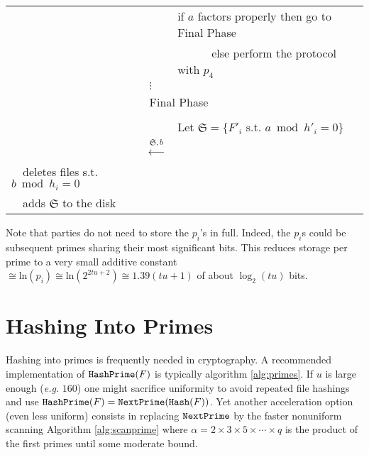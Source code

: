 \documentclass[11pt]{llncs}
\begin{document}
\begin{center}
\begin{tabular}{lcl}
                                   &                                                      &if $a$ factors properly then go to {\sf Final Phase}\\
                                   &                                                      &~~~~~~else perform the protocol with $p_4$ ~~\\
                                   &                  $\vdots$
& \\\midrule
\multicolumn{3}{c}{{\sf Final Phase~~}} \\\midrule
                                   &                                                      & \\
                                   &                                                      &Let $\mathfrak{S}=\{F'_i \mbox{~s.t.~} a \bmod h'_i =0\}$~~\\
                                   &~~{\LARGE $\stackrel{\mathfrak{S},b}{\longleftarrow}$}&\\
                                   ~~deletes files s.t. $b \bmod h_i =0$&                                                      &\\
                                   ~~adds $\mathfrak{S}$ to the disk
                                   &
                                   &\\\bottomrule
\end{tabular}
\end{center}

Note that parties do not need to store the $p_i$'s in full. Indeed, the $p_i$s could be subsequent primes sharing their most significant bits. This reduces storage per prime to a very small additive constant $ \cong \mbox{ln}(p_i) \cong \mbox{ln}(2^{2tu+2}) \cong 1.39(tu+1)$ of about $\log_2(tu)$ bits.

\section{Hashing Into Primes}

Hashing into primes is frequently needed in cryptography. A recommended implementation of $\mbox{{\tt HashPrime}}(F)$ is typically algorithm \ref{alg:primes}. If $u$ is large enough ({\sl e.g.} $160$) one might sacrifice uniformity to avoid repeated file hashings and use $\mbox{{\tt HashPrime}}(F)=\mbox{{\tt NextPrime}}(\mbox{{\tt Hash}}(F))$. Yet another acceleration option (even less uniform) consists in replacing $\mbox{{\tt NextPrime}}$ by the faster nonuniform scanning Algorithm \ref{alg:scanprime} where $\alpha=2\times 3\times 5\times \cdots \times q$ is the product of the first primes until some moderate bound.
 
\end{document}
